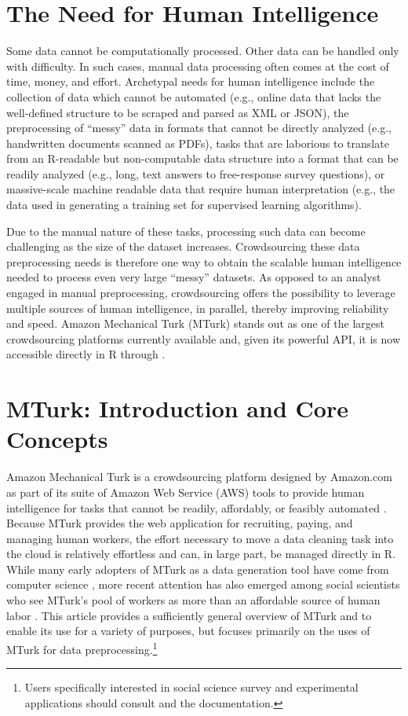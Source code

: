 \section{The Need for Human Intelligence}
Some data cannot be computationally processed. Other data can be handled only with difficulty. In such cases, manual data processing often comes at the cost of time, money, and effort. Archetypal needs for human intelligence include the collection of data which cannot be automated (e.g., online data that lacks the well-defined structure to be scraped and parsed as XML or JSON), the preprocessing of ``messy'' data in formats that cannot be directly analyzed (e.g., handwritten documents scanned as PDFs), tasks that are laborious to translate from an R-readable but non-computable data structure into a format that can be readily analyzed (e.g., long, text answers to free-response survey questions), or massive-scale machine readable data that require human interpretation (e.g., the data used in generating a training set for supervised learning algorithms).

Due to the manual nature of these tasks, processing such data can become challenging as the size of the dataset increases. Crowdsourcing these data preprocessing needs is therefore one way to obtain the scalable human intelligence needed to process even very large ``messy'' datasets. As opposed to an analyst engaged in manual preprocessing, crowdsourcing offers the possibility to leverage multiple sources of human intelligence, in parallel, thereby improving reliability and speed. Amazon Mechanical Turk (MTurk) stands out as one of the largest crowdsourcing platforms currently available and, given its powerful API, it is now accessible directly in R through .

\section{MTurk: Introduction and Core Concepts}
Amazon Mechanical Turk is a crowdsourcing platform designed by Amazon.com as part of its suite of Amazon Web Service (AWS) tools to provide human intelligence for tasks that cannot be readily, affordably, or feasibly automated \citep{Amazon2012}. Because MTurk provides the web application for recruiting, paying, and managing human workers, the effort necessary to move a data cleaning task into the cloud is relatively effortless and can, in large part, be managed directly in R. While many early adopters of MTurk as a data generation tool have come from computer science \citep{MasonSuri2011, KitturChiSuh2008}, more recent attention has also emerged among social scientists who see MTurk's pool of workers as more than an affordable source of human labor \citep{BuhrmesterKwangGosling2011, BerinskyHuberLenz2010, PaolacciChandlerStern2010}. This article provides a sufficiently general overview of MTurk and  to enable its use for a variety of purposes, but focuses primarily on the uses of MTurk for data preprocessing.\footnote{Users specifically interested in social science survey and experimental applications should consult \citet{Leeper2013a} and the  documentation.}

